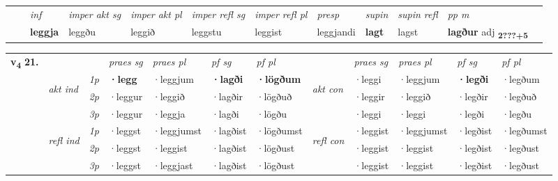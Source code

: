 \begin{tabular}{llllllllllll}
 & & \textit{inf} & \textit{imper akt sg} & \textit{imper akt pl} & \textit{imper refl sg} & \textit{imper refl pl} & \textit{presp} & \textit{supin} & \textit{supin refl} & \textit{pp m}     \\*
  & & \textbf{leggja} & leggðu  & leggið & leggstu & leggist & leggjandi &  \textbf{lagt} & lagst & \textbf{lagður} adj \textbf{\textsubscript{2???+5}} \\*
\cmidrule{1-12}
\end{tabular}



\begin{tabular}{llllllllllll} \toprule
\multirow{4}{*}{{{\textbf{v{\textsubscript{4}}} \Large{\textbf{21.}}}}}  & &   &  \textit{praes sg}  & \textit{praes pl}  &\textit{ pf sg} & \textit{pf pl} &  &  \textit{praes sg}  & \textit{praes pl}  & \textit{pf sg} & \textit{pf pl } \\*
	\cmidrule{4-7} \cmidrule{9-12}
 & \multirow{3}{*}{\begin{turn}{90}\textit{akt ind}\end{turn}} & {\textit{1p}} & \textbf{·legg} & ·leggjum    & \textbf{·lagði} & \textbf{·lögðum} & \multirow{3}{*}{\begin{turn}{90}\textit{akt con}\end{turn}} &·leggi & ·leggjum & \textbf{·legði} & ·legðum\\*
& &  {\textit{2p}} &  ·leggur  & ·leggið   & ·lagðir & ·lögðuð & & ·leggir & ·leggið & ·legðir & ·legðuð \\*
& &  {\textit{3p}} & ·leggur & ·leggja   & ·lagði & ·lögðu & & ·leggi & ·leggi& ·legði & ·legðu  \\*
\cmidrule{4-7} \cmidrule{9-12}
 &\multirow{3}{*}{\begin{turn}{90}\textit{refl ind}\end{turn}} & {\textit{1p}} & ·leggst & ·leggjumst    & ·lagðist & ·lögðumst & \multirow{3}{*}{\begin{turn}{90}\textit{refl con}\end{turn}}  &·leggist & ·leggjumst & ·legðist & ·legðumst\\*
 &&  {\textit{2p}} &  ·leggst  & ·leggist   & ·lagðist & ·lögðust & &·leggist & ·leggist & ·legðist & ·legðust \\*
& &  {\textit{3p}} & ·leggst & ·leggjast   & ·lagðist & ·lögðust & & ·leggist & ·leggist& ·legðist & ·legðust  \\*
\cmidrule{4-7} \cmidrule{9-12}
\end{tabular}


